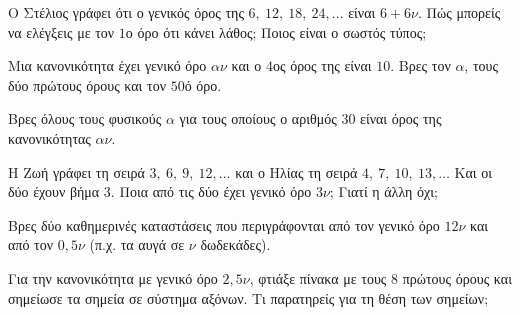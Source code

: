 
\ex Ο Στέλιος γράφει ότι ο γενικός όρος της $6,\ 12,\ 18,\ 24,\dots$ είναι $6+6\nu$. Πώς μπορείς να ελέγξεις με τον $1$ο όρο ότι κάνει λάθος; Ποιος είναι ο σωστός τύπος;

\ex Μια κανονικότητα έχει γενικό όρο $\alpha\nu$ και ο $4$ος όρος της είναι $10$. Βρες τον $\alpha$, τους δύο πρώτους όρους και τον $50$ό όρο.

\ex Βρες όλους τους φυσικούς $\alpha$ για τους οποίους ο αριθμός $30$ είναι όρος της κανονικότητας $\alpha\nu$.

\ex Η Ζωή γράφει τη σειρά $3,\ 6,\ 9,\ 12,\dots$ και ο Ηλίας τη σειρά $4,\ 7,\ 10,\ 13,\dots$ Και οι δύο έχουν βήμα $3$. Ποια από τις δύο έχει γενικό όρο $3\nu$; Γιατί η άλλη όχι;


\ex Βρες δύο καθημερινές καταστάσεις που περιγράφονται από τον γενικό όρο $12\nu$ και από τον $0{,}5\nu$ (π.χ. τα αυγά σε $\nu$ δωδεκάδες).

\ex Για την κανονικότητα με γενικό όρο $2{,}5\nu$, φτιάξε πίνακα με τους $8$ πρώτους όρους και σημείωσε τα σημεία σε σύστημα αξόνων. Τι παρατηρείς για τη θέση των σημείων;
